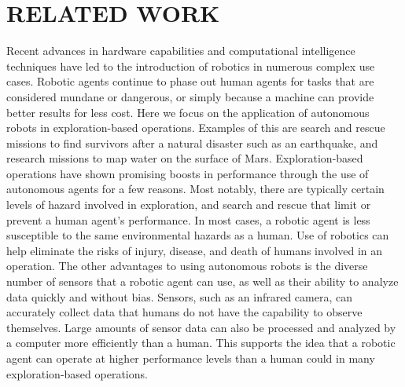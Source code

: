 

\chapter{RELATED WORK} \label{ch:related_works}
Recent advances in hardware capabilities and computational intelligence techniques have led to the introduction of robotics in numerous complex use cases.
Robotic agents continue to phase out human agents for tasks that are considered mundane or dangerous, or simply because a machine can provide better results for less cost.
Here we focus on the application of autonomous robots in exploration-based operations.
Examples of this are search and rescue missions to find survivors after a natural disaster such as an earthquake, and research missions to map water on the surface of Mars.
Exploration-based operations have shown promising boosts in performance through the use of autonomous agents for a few reasons.
Most notably, there are typically certain levels of hazard involved in exploration, and search and rescue that limit or prevent a human agent's performance.
In most cases, a robotic agent is less susceptible to the same environmental hazards as a human.
Use of robotics can help eliminate the risks of injury, disease, and death of humans involved in an operation.
The other advantages to using autonomous robots is the diverse number of sensors that a robotic agent can use, as well as their ability to analyze data quickly and without bias.
Sensors, such as an infrared camera, can accurately collect data that humans do not have the capability to observe themselves.
Large amounts of sensor data can also be processed and analyzed by a computer more efficiently than a human.
This supports the idea that a robotic agent can operate at higher performance levels than a human could in many exploration-based operations.

